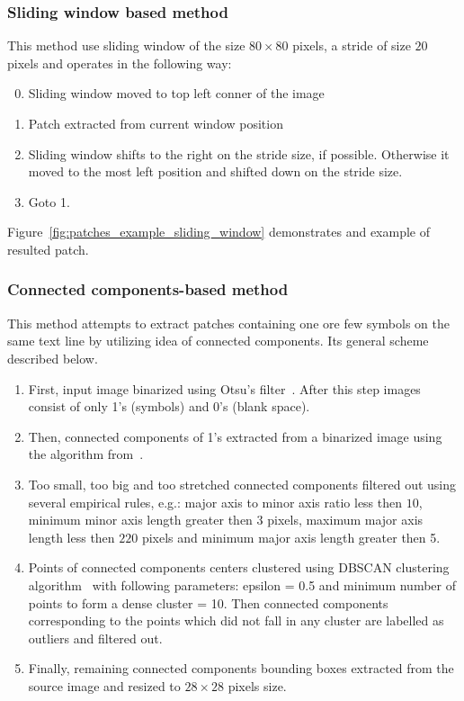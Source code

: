 \documentclass[conference,a4paper]{ieeetran}
\begin{document}
\subsubsection{Sliding window based method}
This method use sliding window of the size $80\times 80$ pixels, a stride of size $20$ pixels and operates in the following way:
\begin{enumerate}
  \setcounter{enumi}{-1}
	\item Sliding window moved to top left conner of the image
	\item Patch extracted from current window position
	\item Sliding window shifts to the right on the stride size, if possible. Otherwise it moved to the most left position and shifted down on the stride size.
	\item Goto 1.
\end{enumerate} 
Figure~\ref{fig:patches_example_sliding_window} demonstrates and example of resulted patch. 

\subsubsection{Connected components-based method}
This method attempts to extract patches containing one ore few symbols on the same text line by utilizing idea of connected components. Its general scheme described below.
\begin{enumerate}
	\item First, input image binarized using Otsu's filter~\cite{otsu1975threshold}. After this step images consist of only 1's (symbols) and 0's (blank space).
	\item Then, connected components of 1's extracted from a binarized image using the algorithm from~\cite{fiorio1996connected_components}. 
	\item Too small, too big and too stretched connected components filtered out using several empirical rules, e.g.: major axis to minor axis ratio less then $10$, minimum minor axis length greater then $3$ pixels, maximum major axis length less then $220$ pixels and  minimum major axis length greater then 5.
	\item Points of connected components centers clustered using DBSCAN clustering algorithm~\cite{ester1996dbscan,GranVolk} with following parameters: epsilon = 0.5 and minimum number of points to form a dense cluster = 10. Then connected components corresponding to the points which did not fall in any cluster are labelled as outliers and filtered out.
	\item Finally, remaining connected components bounding boxes extracted from the source image and resized to $28\times 28$ pixels size.
\end{enumerate}
\end{document}
